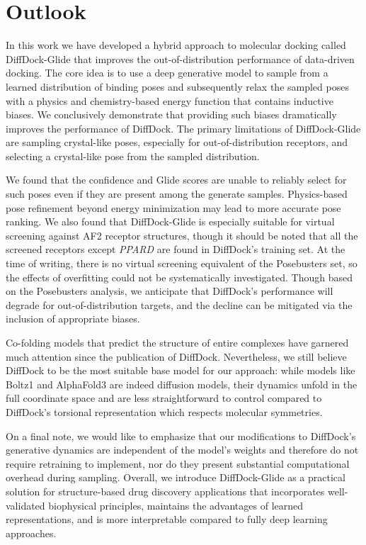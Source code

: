 \documentclass[%
 aip,
 amsmath,amssymb,
reprint,%
]{revtex4-1}
\begin{document}
\section{Outlook}
In this work we have developed a hybrid approach to molecular docking called DiffDock-Glide that improves the out-of-distribution performance of data-driven docking. The core idea is to use a deep generative model to sample from a learned distribution of binding poses and subsequently relax the sampled poses with a physics and chemistry-based energy function that contains inductive biases. We conclusively demonstrate that providing such biases dramatically improves the performance of DiffDock. The primary limitations of DiffDock-Glide are sampling crystal-like poses, especially for out-of-distribution receptors, and selecting a crystal-like pose from the sampled distribution. 

We found that the confidence and Glide scores are unable to reliably select for such poses even if they are present among the generate samples. Physics-based pose refinement beyond energy minimization may lead to more accurate pose ranking. We also found that DiffDock-Glide is especially suitable for virtual screening against AF2 receptor structures, though it should be noted that all the screened receptors except {\it PPARD} are found in DiffDock's training set. At the time of writing, there is no virtual screening equivalent of the Posebusters set, so the effects of overfitting could not be systematically investigated. Though based on the Posebusters analysis, we anticipate that DiffDock's performance will degrade for out-of-distribution targets, and the decline can be mitigated via the inclusion of appropriate biases. 

Co-folding models that predict the structure of entire complexes have garnered much attention since the publication of DiffDock. Nevertheless, we still believe DiffDock to be the most suitable base model for our approach: while models like Boltz1 \cite{wohlwend2024boltz1} and AlphaFold3\cite{abramson2024af3} are indeed diffusion models, their dynamics unfold in the full coordinate space and are less straightforward to control compared to DiffDock's torsional representation which respects molecular symmetries.

On a final note, we would like to emphasize that our modifications to DiffDock's generative dynamics are independent of the model's weights and therefore do not require retraining to implement, nor do they present substantial computational overhead during sampling. Overall, we introduce DiffDock-Glide as a practical solution for structure-based drug discovery applications that incorporates well-validated biophysical principles, maintains the advantages of learned representations, and is more interpretable compared to fully deep learning approaches. 
\end{document}
